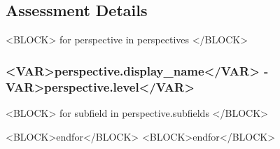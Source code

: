 \subsection{Assessment Details}

<BLOCK> for perspective in perspectives </BLOCK>
\subsubsection{<VAR>perspective.display_name</VAR> - \<VAR>perspective.level</VAR>}

<BLOCK> for subfield in perspective.subfields </BLOCK>

<BLOCK>endfor</BLOCK>
\newpage
<BLOCK>endfor</BLOCK>